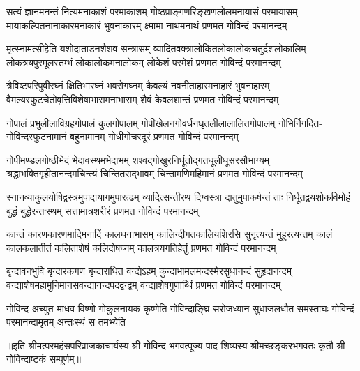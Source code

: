 
\fourlineindentedshloka
{सत्यं ज्ञानमनन्तं नित्यमनाकाशं परमाकाशम्}
{गोष्ठप्राङ्गणरिङ्खणलोलमनायासं परमायासम्}
{मायाकल्पितनानाकारमनाकारं भुवनाकारम्}
{क्ष्मामा नाथमनाथं प्रणमत गोविन्दं परमानन्दम्}

\fourlineindentedshloka
{मृत्स्नामत्सीहेति यशोदाताडनशैशव-सन्त्रासम्}
{व्यादितवक्त्रालोकितलोकालोकचतुर्दशलोकालिम्}
{लोकत्रयपुरमूलस्तम्भं लोकालोकमनालोकम्}
{लोकेशं परमेशं प्रणमत गोविन्दं परमानन्दम्}

\fourlineindentedshloka
{त्रैविष्टपरिपुवीरघ्नं क्षितिभारघ्नं भवरोगघ्नम्}
{कैवल्यं नवनीताहारमनाहारं भुवनाहारम्}
{वैमल्यस्फुटचेतोवृत्तिविशेषाभासमनाभासम्}
{शैवं केवलशान्तं प्रणमत गोविन्दं परमानन्दम्}

\fourlineindentedshloka
{गोपालं प्रभुलीलाविग्रहगोपालं कुलगोपालम्}
{गोपीखेलनगोवर्धनधृतलीलालालितगोपालम्}
{गोभिर्निगदित-गोविन्दस्फुटनामानं बहुनामानम्}
{गोधीगोचरदूरं प्रणमत गोविन्दं परमानन्दम्}

\fourlineindentedshloka
{गोपीमण्डलगोष्ठीभेदं भेदावस्थमभेदाभम्}
{शश्वद्गोखुरनिर्धूतोद्गतधूलीधूसरसौभाग्यम्}
{श्रद्धाभक्तिगृहीतानन्दमचिन्त्यं चिन्तितसद्भावम्}
{चिन्तामणिमहिमानं प्रणमत गोविन्दं परमानन्दम्}

\fourlineindentedshloka
{स्नानव्याकुलयोषिद्वस्त्रमुपादायागमुपारूढम्}
{व्यादित्सन्तीरथ दिग्वस्त्रा दातुमुपाकर्षन्तं ताः}
{निर्धूतद्वयशोकविमोहं बुद्धं बुद्धेरन्तःस्थम्}
{सत्तामात्रशरीरं प्रणमत गोविन्दं परमानन्दम्}

\fourlineindentedshloka
{कान्तं कारणकारणमादिमनादिं कालघनाभासम्}
{कालिन्दीगतकालियशिरसि सुनृत्यन्तं मुहुरत्यन्तम्}
{कालं कालकलातीतं कलिताशेषं कलिदोषघ्नम्}
{कालत्रयगतिहेतुं प्रणमत गोविन्दं परमानन्दम्}

\fourlineindentedshloka
{बृन्दावनभुवि बृन्दारकगण बृन्दाराधित वन्द्येऽहम्}
{कुन्दाभामलमन्दस्मेरसुधानन्दं सुहृदानन्दम्}
{वन्द्याशेषमहामुनिमानसवन्द्यानन्दपदद्वन्द्वम्}
{वन्द्याशेषगुणाब्धिं प्रणमत गोविन्दं परमानन्दम्}

{गोविन्द अच्युत माधव विष्णो गोकुलनायक कृष्णेति}
{गोविन्दाङ्घ्रि-सरोजध्यान-सुधाजलधौत-समस्ताघः}
{गोविन्दं परमानन्दामृतम् अन्तःस्थं स तमभ्येति}

॥इति श्रीमत्परमहंसपरिव्राजकाचार्यस्य श्री-गोविन्द-भगवत्पूज्य-पाद-शिष्यस्य 
श्रीमच्छङ्करभगवतः कृतौ श्री-गोविन्दाष्टकं सम्पूर्णम्॥